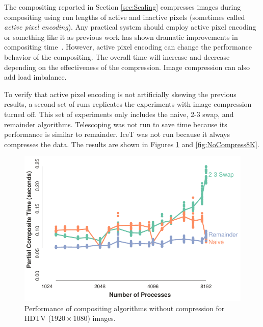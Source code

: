 \documentclass{vgtc}                          %
\newcommand*{\lcite}[1]{~\cite{#1}}
\newcommand*{\keyterm}[1]{\emph{#1}}
\newcommand{\textalgorithm}[1]{\textsf{#1}\xspace}
\newcommand{\ttswap}{\textalgorithm{2-3 swap}}
\newcommand{\naive}{\textalgorithm{naive}}
\newcommand{\Telescoping}{\textalgorithm{Telescoping}}
\newcommand{\remainder}{\textalgorithm{remainder}}
\begin{document}
The compositing reported in Section \ref{sec:Scaling} compresses images during compositing using run lengths of active and inactive pixels (sometimes called \keyterm{active pixel encoding}).
Any practical system should employ active pixel encoding or something like it as previous work has shown dramatic improvements in compositing time\lcite{Ahrens1998,Yang1999,Moreland2001,Takeuchi2003}.
However, active pixel encoding can change the performance behavior of the compositing.
The overall time will increase and decrease depending on the effectiveness of the compression.
Image compression can also add load imbalance.

To verify that active pixel encoding is not artificially skewing the previous results, a second set of runs replicates the experiments with image compression turned off.
This set of experiments only includes the \naive, \ttswap, and \remainder algorithms.
\Telescoping was not run to save time because its performance is similar to \remainder.
IceT was not run because it always compresses the data.
The results are shown in Figures \ref{fig:NoCompressHDTV} and \ref{fig:NoCompress8K}.

\begin{figure}
  \centering
  \includegraphics[width=\linewidth]{no-compress-hdtv}
  \caption{
    Performance of compositing algorithms without compression for HDTV ($1920 \times 1080$) images.
  }
  \label{fig:NoCompressHDTV}
\end{figure}
\end{document}
